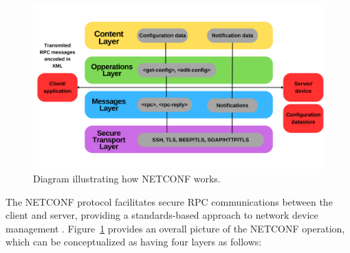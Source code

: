 \begin{figure}[!ht]
    \centering
    \includegraphics[width=\linewidth]{Images/network_configuration_protocol-f_mobile.png}
    \caption{Diagram illustrating how NETCONF works.}
    \label{fig:example}
\end{figure}

The NETCONF protocol facilitates secure RPC communications between the client and server, providing a standards-based approach to network device management \cite{techtarget}. Figure~\ref{fig:example} provides an overall picture of the NETCONF operation, which can be conceptualized as having four layers as follows:

